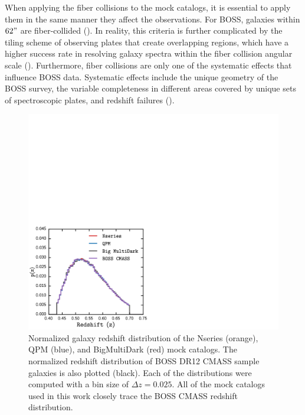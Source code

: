 When applying the fiber collisions to the mock catalogs, it is essential to 
apply them in the same manner they affect the observations. For BOSS, galaxies
within $62"$ are fiber-collided (\citealt{Anderson:2012aa}). In reality, 
this criteria is further complicated by the tiling scheme of observing 
plates that create overlapping regions, which have a higher success rate in 
resolving galaxy spectra within the fiber collision angular scale (\citealt{
Guo:2012aa, Reid:2012aa}). Furthermore, fiber collisions are only one of the 
systematic effects that influence BOSS data. Systematic effects include the 
unique geometry of the BOSS survey, the variable completeness in different areas  
covered by unique sets of spectroscopic plates, and redshift failures 
(\citealt{Anderson:2012aa, Ross:2012aa}). 

\def \cmasscolor{black}
\def \ldgcolor{blue}
\def \nseriescolor{orange}
\def \qpmcolor{blue}
\def \tmcolor{green}
\def \bmdcolor{red}

\begin{figure}
\begin{center}
\includegraphics[width=1.\textwidth]{figs/fc/mock_catalog_z_dist.pdf} 
\caption{Normalized galaxy redshift distribution of the Nseries (\nseriescolor), 
QPM (\qpmcolor), and BigMultiDark (\bmdcolor) mock catalogs. The 
normalized redshift distribution of BOSS DR12 CMASS sample galaxies 
is also plotted (\cmasscolor). Each of the distributions were computed
with a bin size of $\Delta z = 0.025$. All of the mock catalogs used 
in this work closely trace the BOSS CMASS redshift distribution.}
\label{fig:zdist}
\end{center}
\end{figure}


